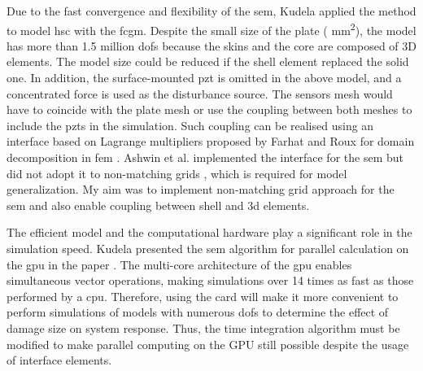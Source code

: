 Due to the fast convergence and flexibility of the \ac{sem}, Kudela \cite{kudela2016parallel} applied the method to model \ac{hsc} with the \ac{fcgm}.
Despite the small size of the plate ( \unit{\square\mm}), the model has more than 1.5 million \acp{dof} because the skins and the core are composed of 3D elements.
The model size could be reduced if the shell element replaced the solid one.
In addition, the surface-mounted \ac{pzt} is omitted in the above model, and a concentrated force is used as the disturbance source.
The sensors mesh would have to coincide with the plate mesh or use the coupling between both meshes to include the \acp{pzt} in the simulation.
Such coupling can be realised using an interface based on Lagrange multipliers proposed by Farhat and Roux for domain decomposition in \ac{fem} \cite{farhat1991method}.
Ashwin et al. implemented the interface for the \ac{sem} but did not adopt it to non-matching grids \cite{ashwin2014formulation}, which is required for model generalization.
My aim was to implement non-matching grid approach for the \ac{sem} and also enable coupling between shell and \ac{3d} elements.

The efficient model and the computational hardware play a significant role in the simulation speed. 
Kudela presented the \ac{sem} algorithm for parallel calculation on the \ac{gpu} in the paper \cite{kudela2016parallel}.
The multi-core architecture of the \ac{gpu} enables simultaneous vector operations, making simulations over 14 times as fast as those performed by a \ac{cpu}.
Therefore, using the card will make it more convenient to perform simulations of models with numerous \acp{dof} to determine the effect of damage size on system response.
Thus, the time integration algorithm must be modified to make parallel computing on the GPU still possible despite the usage of interface elements.
